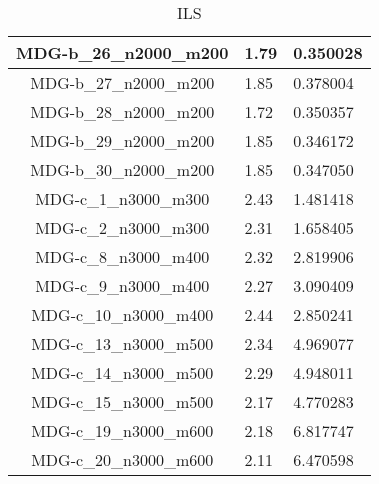 \documentclass[10pt,a4paper]{article}
\begin{document}
\begin{table}[]
\begin{tabular}{|c|l|l|}
		MDG-b\_26\_n2000\_m200 & 1.79                               & 0.350028                             \\ \hline
		MDG-b\_27\_n2000\_m200 & 1.85                               & 0.378004                             \\ \hline
		MDG-b\_28\_n2000\_m200 & 1.72                               & 0.350357                             \\ \hline
		MDG-b\_29\_n2000\_m200 & 1.85                               & 0.346172                             \\ \hline
		MDG-b\_30\_n2000\_m200 & 1.85                               & 0.347050                             \\ \hline
		MDG-c\_1\_n3000\_m300  & 2.43                               & 1.481418                             \\ \hline
		MDG-c\_2\_n3000\_m300  & 2.31                               & 1.658405                             \\ \hline
		MDG-c\_8\_n3000\_m400  & 2.32                               & 2.819906                             \\ \hline
		MDG-c\_9\_n3000\_m400  & 2.27                               & 3.090409                             \\ \hline
		MDG-c\_10\_n3000\_m400 & 2.44                               & 2.850241                             \\ \hline
		MDG-c\_13\_n3000\_m500 & 2.34                               & 4.969077                             \\ \hline
		MDG-c\_14\_n3000\_m500 & 2.29                               & 4.948011                             \\ \hline
		MDG-c\_15\_n3000\_m500 & 2.17                               & 4.770283                             \\ \hline
		MDG-c\_19\_n3000\_m600 & 2.18                               & 6.817747                             \\ \hline
		MDG-c\_20\_n3000\_m600 & 2.11                               & 6.470598                             \\ \hline
	\end{tabular}
	\caption{ILS}
	\label{table:ILS}
\end{table}
\end{document}
